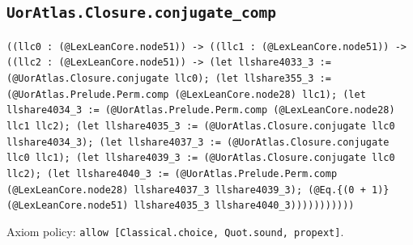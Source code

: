 \documentclass[11pt]{article}
\begin{document}
\subsection*{\texttt{UorAtlas.Closure.conjugate\_comp}}
\noindent\texttt{((llc0 : (@LexLeanCore.node51)) -> ((llc1 : (@LexLeanCore.node51)) -> ((llc2 : (@LexLeanCore.node51)) -> (let llshare4033\_3 := (@UorAtlas.Closure.conjugate llc0); (let llshare355\_3 := (@UorAtlas.Prelude.Perm.comp (@LexLeanCore.node28) llc1); (let llshare4034\_3 := (@UorAtlas.Prelude.Perm.comp (@LexLeanCore.node28) llc1 llc2); (let llshare4035\_3 := (@UorAtlas.Closure.conjugate llc0 llshare4034\_3); (let llshare4037\_3 := (@UorAtlas.Closure.conjugate llc0 llc1); (let llshare4039\_3 := (@UorAtlas.Closure.conjugate llc0 llc2); (let llshare4040\_3 := (@UorAtlas.Prelude.Perm.comp (@LexLeanCore.node28) llshare4037\_3 llshare4039\_3); (@Eq.\{(0 + 1)\} (@LexLeanCore.node51) llshare4035\_3 llshare4040\_3)))))))))))}\par
\noindent Axiom policy: \texttt{allow [Classical.choice, Quot.sound, propext]}.\par
\end{document}
